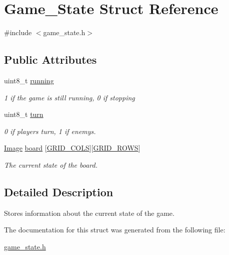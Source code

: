 \hypertarget{structGame__State}{}\section{Game\+\_\+\+State Struct Reference}
\label{structGame__State}


{\ttfamily \#include $<$game\+\_\+state.\+h$>$}

\subsection*{Public Attributes}
\begin{DoxyCompactItemize}
\item 
uint8\+\_\+t \hyperlink{structGame__State_a332734db0872c750d6cad85bf20a9e62}{running}\hypertarget{structGame__State_a332734db0872c750d6cad85bf20a9e62}{}\label{structGame__State_a332734db0872c750d6cad85bf20a9e62}

\begin{DoxyCompactList}\small\item\em 1 if the game is still running, 0 if stopping \end{DoxyCompactList}\item 
uint8\+\_\+t \hyperlink{structGame__State_ac661308b10c7e6293db0ed4af255d94d}{turn}\hypertarget{structGame__State_ac661308b10c7e6293db0ed4af255d94d}{}\label{structGame__State_ac661308b10c7e6293db0ed4af255d94d}

\begin{DoxyCompactList}\small\item\em 0 if player\textquotesingle{}s turn, 1 if enemy\textquotesingle{}s. \end{DoxyCompactList}\item 
\hyperlink{structImage}{Image} \hyperlink{structGame__State_a8f8aaf2c2cee86d71c77f15ece85f9df}{board} \mbox{[}\hyperlink{game__state_8h_a881e2cda79b5951641b07f678f6ef929}{G\+R\+I\+D\+\_\+\+C\+O\+LS}\mbox{]}\mbox{[}\hyperlink{game__state_8h_a5ba0b105774bfdc09ce545d73dcdedd3}{G\+R\+I\+D\+\_\+\+R\+O\+WS}\mbox{]}\hypertarget{structGame__State_a8f8aaf2c2cee86d71c77f15ece85f9df}{}\label{structGame__State_a8f8aaf2c2cee86d71c77f15ece85f9df}

\begin{DoxyCompactList}\small\item\em The current state of the board. \end{DoxyCompactList}\end{DoxyCompactItemize}


\subsection{Detailed Description}
Stores information about the current state of the game. 

The documentation for this struct was generated from the following file\+:\begin{DoxyCompactItemize}
\item 
\hyperlink{game__state_8h}{game\+\_\+state.\+h}\end{DoxyCompactItemize}
